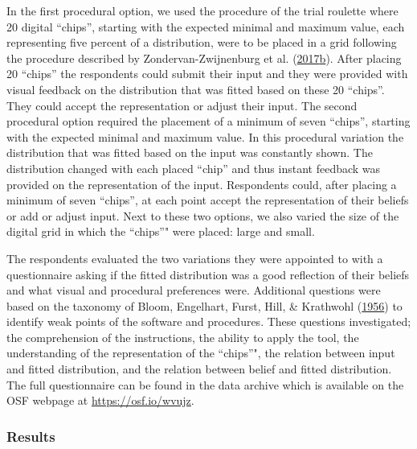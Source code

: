 \documentclass[openright,titlepage,12pt,a4paper]{book}
\begin{document}
In the first procedural option, we used the procedure of the trial roulette where 20 digital ``chips'', starting with the expected minimal and maximum value, each representing five percent of a distribution, were to be placed in a grid following the procedure described by Zondervan-Zwijnenburg et al. (\protect\hyperlink{ref-zondervan-zwijnenburg_application_2017}{2017}\protect\hyperlink{ref-zondervan-zwijnenburg_application_2017}{b}). After placing 20 ``chips'' the respondents could submit their input and they were provided with visual feedback on the distribution that was fitted based on these 20 ``chips''. They could accept the representation or adjust their input. The second procedural option required the placement of a minimum of seven ``chips'', starting with the expected minimal and maximum value. In this procedural variation the distribution that was fitted based on the input was constantly shown. The distribution changed with each placed ``chip'' and thus instant feedback was provided on the representation of the input. Respondents could, after placing a minimum of seven ``chips'', at each point accept the representation of their beliefs or add or adjust input. Next to these two options, we also varied the size of the digital grid in which the ``chips''" were placed: large and small.

The respondents evaluated the two variations they were appointed to with a questionnaire asking if the fitted
distribution was a good reflection of their beliefs and what visual and procedural preferences were. Additional questions were based on the taxonomy of Bloom, Engelhart, Furst, Hill, \& Krathwohl (\protect\hyperlink{ref-bloom_taxonomy_1956}{1956}) to identify weak points of the software and procedures. These questions investigated; the comprehension of the instructions, the ability to apply the tool, the understanding of the representation of the ``chips''", the relation between input and fitted distribution, and the relation between belief and fitted distribution. The full questionnaire can be found in
the data archive which is available on the OSF webpage at \url{https://osf.io/wvujz}.

\hypertarget{results}{%
\subsubsection{Results}\label{results}}
\end{document}
